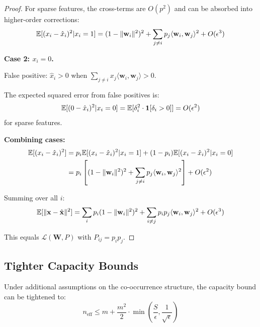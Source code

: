 \begin{proof}
For sparse features, the cross-terms are $O(p^2)$ and can be absorbed into higher-order corrections:
\begin{equation}
\mathbb{E}[(x_i - \hat{x}_i)^2 | x_i = 1] = (1 - \|\mathbf{w}_i\|^2)^2 + \sum_{j \neq i} p_j \langle \mathbf{w}_i, \mathbf{w}_j \rangle^2 + O(\epsilon^3)
\end{equation}

\textbf{Case 2: $x_i = 0$.}

False positive: $\hat{x}_i > 0$ when $\sum_{j \neq i} x_j \langle \mathbf{w}_i, \mathbf{w}_j \rangle > 0$.

The expected squared error from false positives is:
\begin{equation}
\mathbb{E}[(0 - \hat{x}_i)^2 | x_i = 0] = \mathbb{E}[\delta_i^2 \cdot \mathbf{1}[\delta_i > 0]] = O(\epsilon^2)
\end{equation}
for sparse features.

\textbf{Combining cases:}
\begin{align}
\mathbb{E}[(x_i - \hat{x}_i)^2] &= p_i \mathbb{E}[(x_i - \hat{x}_i)^2 | x_i = 1] + (1-p_i) \mathbb{E}[(x_i - \hat{x}_i)^2 | x_i = 0] \\
&= p_i \left[(1 - \|\mathbf{w}_i\|^2)^2 + \sum_{j \neq i} p_j \langle \mathbf{w}_i, \mathbf{w}_j \rangle^2\right] + O(\epsilon^2)
\end{align}

Summing over all $i$:
\begin{equation}
\mathbb{E}[\|\mathbf{x} - \hat{\mathbf{x}}\|^2] = \sum_i p_i (1 - \|\mathbf{w}_i\|^2)^2 + \sum_{i \neq j} p_i p_j \langle \mathbf{w}_i, \mathbf{w}_j \rangle^2 + O(\epsilon^3)
\end{equation}

This equals $\mathcal{L}(\mathbf{W}, P)$ with $P_{ij} = p_i p_j$.
\end{proof}

\subsection{Tighter Capacity Bounds}

\begin{proposition}
\label{prop:tight_capacity}
Under additional assumptions on the co-occurrence structure, the capacity bound can be tightened to:
\begin{equation}
n_{\text{eff}} \leq m + \frac{m^2}{2} \cdot \min\left(\frac{S}{\epsilon}, \frac{1}{\sqrt{\epsilon}}\right)
\end{equation}
\end{proposition}

